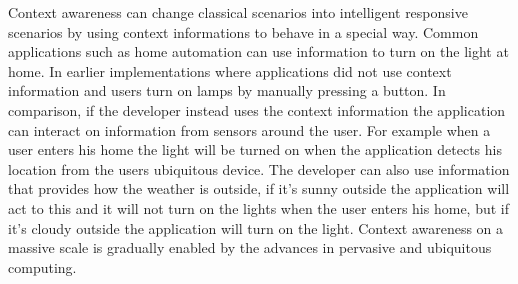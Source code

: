 Context awareness can change classical scenarios into intelligent responsive scenarios by using context informations to behave in a special way. Common applications such as home automation can use information to turn on the light at home. In earlier implementations where applications did not use context information and users turn on lamps by manually pressing a button. 
In comparison, if the developer instead uses the context information the application can interact on information from sensors around the user. For example when a user enters his home the light will be turned on when the application detects his location from the users ubiquitous device. The developer can also use information that provides how the weather is outside, if it's sunny outside the application will act to this and it will not turn on the lights when the user enters his home, but if it's cloudy outside the application will turn on the light. 
Context awareness on a massive scale is gradually enabled by the advances in pervasive and ubiquitous computing. 

